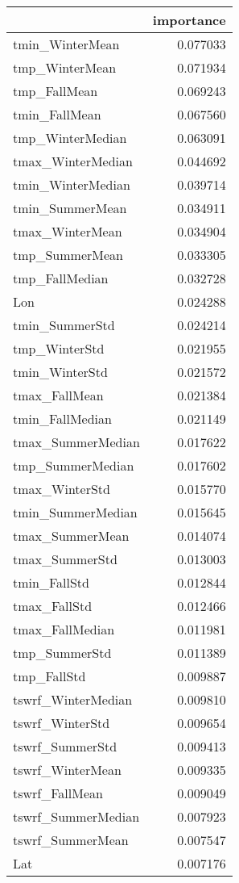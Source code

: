 \begin{tabular}{lr}
\toprule
 & importance \\
\midrule
tmin_WinterMean & 0.077033 \\
tmp_WinterMean & 0.071934 \\
tmp_FallMean & 0.069243 \\
tmin_FallMean & 0.067560 \\
tmp_WinterMedian & 0.063091 \\
tmax_WinterMedian & 0.044692 \\
tmin_WinterMedian & 0.039714 \\
tmin_SummerMean & 0.034911 \\
tmax_WinterMean & 0.034904 \\
tmp_SummerMean & 0.033305 \\
tmp_FallMedian & 0.032728 \\
Lon & 0.024288 \\
tmin_SummerStd & 0.024214 \\
tmp_WinterStd & 0.021955 \\
tmin_WinterStd & 0.021572 \\
tmax_FallMean & 0.021384 \\
tmin_FallMedian & 0.021149 \\
tmax_SummerMedian & 0.017622 \\
tmp_SummerMedian & 0.017602 \\
tmax_WinterStd & 0.015770 \\
tmin_SummerMedian & 0.015645 \\
tmax_SummerMean & 0.014074 \\
tmax_SummerStd & 0.013003 \\
tmin_FallStd & 0.012844 \\
tmax_FallStd & 0.012466 \\
tmax_FallMedian & 0.011981 \\
tmp_SummerStd & 0.011389 \\
tmp_FallStd & 0.009887 \\
tswrf_WinterMedian & 0.009810 \\
tswrf_WinterStd & 0.009654 \\
tswrf_SummerStd & 0.009413 \\
tswrf_WinterMean & 0.009335 \\
tswrf_FallMean & 0.009049 \\
tswrf_SummerMedian & 0.007923 \\
tswrf_SummerMean & 0.007547 \\
Lat & 0.007176 \\

\end{tabular}
